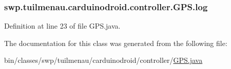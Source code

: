 \subsubsection[{log}]{ swp.\+tuilmenau.\+carduinodroid.\+controller.\+G\+P\+S.\+log}\label{classswp_1_1tuilmenau_1_1carduinodroid_1_1controller_1_1_g_p_s_a413bcab06ed9496b5bd2aa481e91e5d0}


Definition at line 23 of file G\+P\+S.\+java.



The documentation for this class was generated from the following file\+:\begin{DoxyCompactItemize}
\item 
bin/classes/swp/tuilmenau/carduinodroid/controller/\hyperlink{bin_2classes_2swp_2tuilmenau_2carduinodroid_2controller_2_g_p_s_8java}{G\+P\+S.\+java}\end{DoxyCompactItemize}
